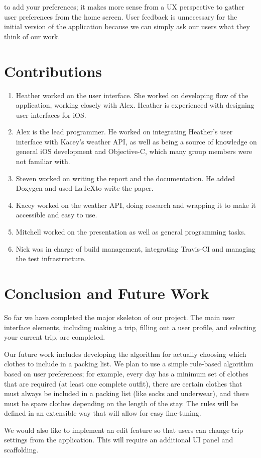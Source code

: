 \documentclass[11pt]{article}
\begin{document}
to add your preferences; it makes more sense from a UX perspective to gather user preferences from the home screen. User feedback is unnecessary for the initial version of the application because we can simply ask our users what they think of our work.

% 

\section{Contributions}
\begin{enumerate}
\item Heather worked on the user interface. She worked on developing flow of the application, working closely with Alex. Heather is experienced with designing user interfaces for iOS.
\item Alex is the lead programmer. He worked on integrating Heather's user interface with Kacey's weather API, as well as being a source of knowledge on general iOS development and Objective-C, which many group members were not familiar with.
\item Steven worked on writing the report and the documentation. He added Doxygen and used \LaTeX to write the paper. 
\item Kacey worked on the weather API, doing research and wrapping it to make it accessible and easy to use. 
\item Mitchell worked on the presentation as well as general programming tasks.
\item Nick was in charge of build management, integrating Travis-CI and managing the test infrastructure.
\end{enumerate}

\section{Conclusion and Future Work}
So far we have completed the major skeleton of our project. The main user interface elements, including making a trip, filling out a user profile, and selecting your current trip, are completed. 

Our future work includes developing the algorithm for actually choosing which clothes to include in a packing list. We plan to use a simple rule-based algorithm based on user preferences; for example, every day has a minimum set of clothes that are required (at least one complete outfit), there are certain clothes that must always be included in a packing list (like socks and underwear), and there must be spare clothes depending on the length of the stay. The rules will be defined in an extensible way that will allow for easy fine-tuning.

We would also like to implement an edit feature so that users can change trip settings from the application. This will require an additional UI panel and scaffolding.
\end{document}
